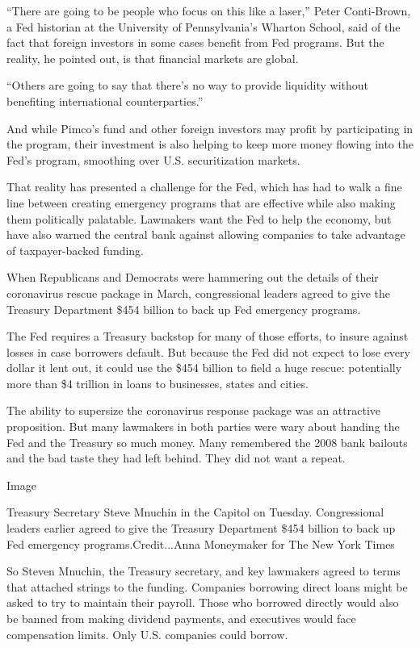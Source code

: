 ``There are going to be people who focus on this like a laser,'' Peter
Conti-Brown, a Fed historian at the University of Pennsylvania's Wharton
School, said of the fact that foreign investors in some cases benefit
from Fed programs. But the reality, he pointed out, is that financial
markets are global.

``Others are going to say that there's no way to provide liquidity
without benefiting international counterparties.''

And while Pimco's fund and other foreign investors may profit by
participating in the program, their investment is also helping to keep
more money flowing into the Fed's program, smoothing over U.S.
securitization markets.

That reality has presented a challenge for the Fed, which has had to
walk a fine line between creating emergency programs that are effective
while also making them politically palatable. Lawmakers want the Fed to
help the economy, but have also warned the central bank against allowing
companies to take advantage of taxpayer-backed funding.

When Republicans and Democrats were hammering out the details of their
coronavirus rescue package in March, congressional leaders agreed to
give the Treasury Department \$454 billion to back up Fed emergency
programs.

The Fed requires a Treasury backstop for many of those efforts, to
insure against losses in case borrowers default. But because the Fed did
not expect to lose every dollar it lent out, it could use the \$454
billion to field a huge rescue: potentially more than \$4 trillion in
loans to businesses, states and cities.

The ability to supersize the coronavirus response package was an
attractive proposition. But many lawmakers in both parties were wary
about handing the Fed and the Treasury so much money. Many remembered
the 2008 bank bailouts and the bad taste they had left behind. They did
not want a repeat.

Image

Treasury Secretary Steve Mnuchin in the Capitol on Tuesday.
Congressional leaders earlier agreed to give the Treasury Department
\$454 billion to back up Fed emergency programs.Credit...Anna Moneymaker
for The New York Times

So Steven Mnuchin, the Treasury secretary, and key lawmakers agreed to
terms that attached strings to the funding. Companies borrowing direct
loans might be asked to try to maintain their payroll. Those who
borrowed directly would also be banned from making dividend payments,
and executives would face compensation limits. Only U.S. companies could
borrow.

